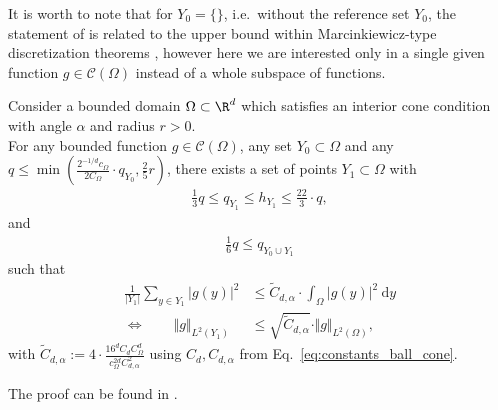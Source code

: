 \documentclass[a4paper, 10pt]{article}
\begin{document}
It is worth to note that for $Y_0 = \{ \}$, i.e.\ without the reference set $Y_0$, the statement of  is related to the upper bound within Marcinkiewicz-type discretization theorems \cite[Eq.\ (1.1)]{temlyakov2018marcinkiewicz},
however here we are interested only in a single given function $g \in \mathcal{C}(\Omega)$ instead of a whole subspace of functions.

\begin{theorem}
\label{th:utility_theorem_new}
Consider a bounded domain $\Omega \subset \R^d$ which satisfies an interior cone condition with angle $\alpha$ and radius $r > 0$. \\
For any bounded function $g \in \mathcal{C}(\Omega)$, any set $Y_0 \subset \Omega$ and any $q \leq \min \left( \frac{2^{-1/d} c_\Omega}{2 C_\Omega} \cdot q_{Y_0}, \frac{2}{5}r \right)$, 
there exists a set of points $Y_1 \subset \Omega$ with
\begin{align*}
\frac{1}{3} q \leq q_{Y_1} \leq h_{Y_1} \leq \frac{22}{3} \cdot q,
\end{align*}
and
\begin{align*}
\frac{1}{6}q \leq q_{Y_0 \cup Y_1} 
\end{align*}
such that
\begin{align*}
\frac{1}{|Y_1|} \sum_{y \in Y_1} |g(y)|^2 &\leq \tilde{C}_{d,\alpha} \cdot \int_{\Omega} |g(y)|^2 ~ \mathrm{d}y \\
\Leftrightarrow \qquad \Vert g \Vert_{L^2(Y_1)} &\leq \sqrt{\tilde{C}_{d,\alpha}} \cdot \Vert g \Vert_{L^2(\Omega)},
\end{align*}
with $\tilde{C}_{d,\alpha} := 4 \cdot  \frac{16^d C_d C_\Omega^d}{c_\Omega^{2d} C_{d, \alpha}^2}$ using $C_d, C_{d, \alpha}$ from Eq.~\eqref{eq:constants_ball_cone}.
\end{theorem}

The proof can be found in .


%
%
%


%

%
%
%
%
%
%
%
%
%
%
%
%
%
%
%
%
%
%
%
%
%
%
%
%
%
%
%
%
%
%
%
%
%
%
%
%
%
%
%
%
%
%
%
%
%
%
%
%
%
%
%
%
%
%
%
%
%
%
%
%
%
%
%
%
%
%
%
%
%
%
%
%
%
%
%
%
%
%
%
%
%
%
%
%
%
%
%
%
%
%
%
%
%
%
%
%
%
%
%
%
%
%
%
%
%
%
%
%
%
%
%
%
%
%
%
%
%
%
%
%
%
%
%
%
%
%
%
%
%
%
%
%
%
%
%
%
%
%
%
%
%
%
%
%
%
%
%
%
%
%
%
%
%
%
%
%
%
%
%
%
%
%
%
%
%
%
%
%
%
%
%
%
%
%
%
%
%
%
%
%
%
%
%
%
%
%
%
%
%
%
%
%
%
%
%
%
%
%
%
%
%
%
%
%


%
%
%

%
%
%
%
%
%
%
%
%
%
%
%
%
%
%
%
%
%
%
%
%
%
%
%
%
%
%
%
%
%
%
%
%
%
%
%
%
%
%
%
%
%
%
%
%
%
%
%
%
%
%
%
%
%
%
%
%
%
%
%
%
%
%
%
%
%
%
%
%
%
%
%
%
%
%
%
%
%
%
%
%
%
%
%
%
%
%
%
%
%
%
%
%
%
%
%
%
%
%
%
%
%
%
%
%
%
%
%
%
%
%
%
%
%
%
%
%
%
%
%
%
%
%
%
%
%
\end{document}
